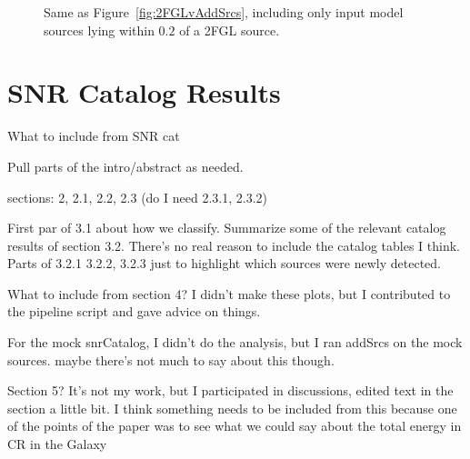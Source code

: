 {%
\begin{figure}[h!]%
	\centering
	\caption{Same as Figure~\ref{fig:2FGLvAddSrcs}, including only input model sources lying within $0.2$\degr{} of a 2FGL source.}%
	\label{fig:2FGLvAddSrcsAssoc} 
\end{figure}

\section{SNR Catalog Results}
\label{snrCat:results}
What to include from SNR cat

Pull parts of the intro/abstract as needed.

sections: 2, 2.1, 2.2, 2.3 (do I need 2.3.1, 2.3.2)

 First par of 3.1 about how we classify. Summarize some of the relevant catalog results of section 3.2. There's no real reason to include the catalog tables I think. Parts of 3.2.1 3.2.2, 3.2.3 just to highlight which sources were newly detected. 
 
 What to include from section 4? I didn't make these plots, but I contributed to the pipeline script and gave advice on things. 
 
 For the mock snrCatalog, I didn't do the analysis, but I ran addSrcs on the mock sources. maybe there's not much to say about this though.

Section 5? It's not my work, but I participated in discussions, edited text in the section a little bit. I think something needs to be included from this because one of the points of the paper was to see what we could say about the total energy in CR in the Galaxy

}
